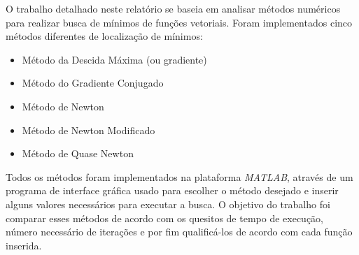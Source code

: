 O trabalho detalhado neste relatório se baseia em analisar métodos numéricos para realizar busca de mínimos de funções vetoriais. Foram implementados cinco métodos diferentes de localização de mínimos:

\begin{itemize}
	\item Método da Descida Máxima (ou gradiente)
	\item Método do Gradiente Conjugado
	\item Método de Newton
	\item Método de Newton Modificado
	\item Método de Quase Newton
\end{itemize}

Todos os métodos foram implementados na plataforma \textit{MATLAB}, através de um programa de interface gráfica usado para escolher o método desejado e inserir alguns valores necessários para executar a busca. O objetivo do trabalho foi comparar esses métodos de acordo com os quesitos de tempo de execução, número necessário de iterações e por fim qualificá-los de acordo com cada função inserida.